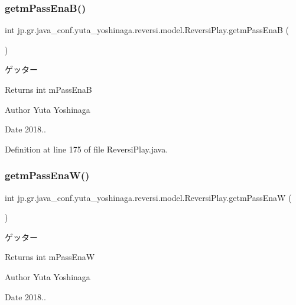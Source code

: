 \subsubsection{\texorpdfstring{getm\+Pass\+Ena\+B()}{getmPassEnaB()}}
{\footnotesize\ttfamily int jp.\+gr.\+java\+\_\+conf.\+yuta\+\_\+yoshinaga.\+reversi.\+model.\+Reversi\+Play.\+getm\+Pass\+EnaB (\begin{DoxyParamCaption}{ }\end{DoxyParamCaption})}



ゲッター 

\begin{DoxyReturn}{Returns}
int m\+Pass\+EnaB 
\end{DoxyReturn}
\begin{DoxyAuthor}{Author}
Yuta Yoshinaga 
\end{DoxyAuthor}
\begin{DoxyDate}{Date}
2018.. 
\end{DoxyDate}


Definition at line 175 of file Reversi\+Play.\+java.

\mbox{\label{classjp_1_1gr_1_1java__conf_1_1yuta__yoshinaga_1_1reversi_1_1model_1_1_reversi_play_a73d15ded7c188b5375828b710d89f8b7}} 
\subsubsection{\texorpdfstring{getm\+Pass\+Ena\+W()}{getmPassEnaW()}}
{\footnotesize\ttfamily int jp.\+gr.\+java\+\_\+conf.\+yuta\+\_\+yoshinaga.\+reversi.\+model.\+Reversi\+Play.\+getm\+Pass\+EnaW (\begin{DoxyParamCaption}{ }\end{DoxyParamCaption})}



ゲッター 

\begin{DoxyReturn}{Returns}
int m\+Pass\+EnaW 
\end{DoxyReturn}
\begin{DoxyAuthor}{Author}
Yuta Yoshinaga 
\end{DoxyAuthor}
\begin{DoxyDate}{Date}
2018.. 
\end{DoxyDate}



